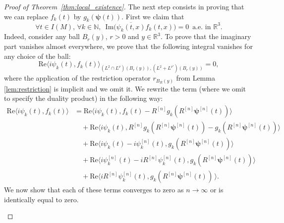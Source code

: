 \documentclass[12pt,a4paper]{amsart}
\numberwithin{equation}{section}
\newcommand{\ulpsi}{\boldsymbol{\psi}}
\begin{document}
\begin{proof}[Proof of Theorem~\ref{thm:local_existence}]
		The next step consists in proving that we can replace $ f_{k} (t) $ by $  g_{k}(\ulpsi(t)) $. 
		First we claim that
		\begin{equation}\label{eq:imaginary_part_vanishes}
			\forall t \in I(M), \, \forall k \in \mathbb{N}, \;\ \mathrm{Im} \big( \overline{\psi_k(t,x)} f_{k}(t,x) \big) = 0  \;\ \text{a.e. in } \mathbb{R}^3.  
		\end{equation}
		Indeed, consider any ball $ B_r(y)$, $ r >0$ and $ y \in \mathbb{R}^3 $. To prove that the imaginary part vanishes almost everywhere, we prove that the following integral vanishes for any choice of the ball:
		\begin{equation}
			\mathrm{Re} \langle i \psi_k(t) , f_{k}(t) \rangle_{(L^2\cap L^{\nu})(B_r(y)),(L^2+L^{\nu'})(B_r(y))} = 0 ,
		\end{equation}
		where the application of the restriction operator $r_{B_R(y)}$ from Lemma \ref{lem:restriction} is implicit and we omit it.
		We rewrite the term (where we omit to specify the duality product) in the following way:
		\begin{subequations}
			\begin{align}
				\mathrm{Re} \langle i \psi_k(t) , f_{k}(t) \rangle &=  \mathrm{Re} \langle i \psi_k(t) , f_{k}(t) -R^{[n]} g_{k}(R^{[n]}\ulpsi^{[n]}(t)) \rangle \, \label{subeq:vanishing-realpart-scalar-product1}\\ 
				&\quad + \mathrm{Re} \langle i \psi_k(t) , R^{[n]} g_{k}(R^{[n]}\ulpsi^{[n]}(t)) - g_{k}(R^{[n]}\ulpsi^{[n]}(t)) \rangle \,  \label{subeq:vanishing-realpart-scalar-product2}\\
				&\quad + \mathrm{Re} \langle i \psi_k(t) - i \psi^{[n]}_{k}(t) ,  g_{k}(R^{[n]}\ulpsi^{[n]}(t)) \rangle \, \label{subeq:vanishing-realpart-scalar-product3}\\
				&\quad + \mathrm{Re} \langle i \psi^{[n]}_{k}(t) -i R^{[n]} \psi^{[n]}_{k}(t) , g_{k}(R^{[n]}\ulpsi^{[n]}(t)) \rangle \, \label{subeq:vanishing-realpart-scalar-product4}\\
				&\quad + \mathrm{Re} \langle i R^{[n]} \psi^{[n]}_{k}(t) , g_{k}(R^{[n]}\ulpsi^{[n]}(t)) \, \rangle . \label{subeq:vanishing-realpart-scalar-product5}
			\end{align}
		\end{subequations}
		We now show that each of these terms converges to zero as $ n \rightarrow  \infty $ or is identically equal to zero. 
		\begin{itemize}

\end{itemize}
\end{proof}
\end{document}
